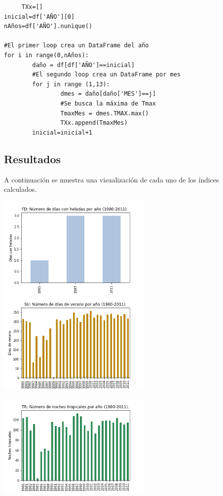 \documentclass[letterpaper,12pt]{article}
\begin{document}
 \begin{verbatim}
     TXx=[]
inicial=df['AÑO'][0]
nAños=df['AÑO'].nunique()

#El primer loop crea un DataFrame del año
for i in range(0,nAños):
        daño = df[df['AÑO']==inicial]
        #El segundo loop crea un DataFrame por mes
        for j in range (1,13):
                dmes = daño[daño['MES']==j]
                #Se busca la máxima de Tmax 
                TmaxMes = dmes.TMAX.max()
                TXx.append(TmaxMes)    
        inicial=inicial+1

 \end{verbatim}


\subsection{Resultados}
A continuación se muestra una visualización de cada uno de los índices calculados.


\begin{center}
	\includegraphics[height=5cm]{grafica1.png}\hspace*{\fill}
	\label{graf1}
   \includegraphics[height=5cm]{grafica2.png}
    \label{graf2}
\end{center}

\begin{center}
	\includegraphics[height=5cm]{grafica3.png}
	\label{graf3}
\end{center}
\end{document}

